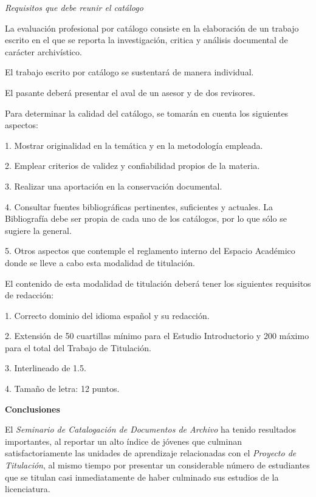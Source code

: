 \noindent \textsl{Requisitos que debe reunir el catálogo}

\noindent La evaluación profesional por catálogo consiste en la 
elaboración de un trabajo escrito en el que se reporta la 
investigación, critica y análisis documental de carácter archivístico.

El trabajo escrito por catálogo se sustentará de manera individual.

El pasante deberá presentar el aval de un asesor y de dos revisores.

Para determinar la calidad del catálogo, se tomarán en cuenta los 
siguientes aspectos:
\begin{Obs} 
\item[1.] Mostrar originalidad en la temática y en la metodología empleada.
\item[2.] Emplear criterios de validez y confiabilidad propios de la materia.
\item[3.]  Realizar una aportación en la conservación documental.
\item[4.]  Consultar fuentes bibliográficas pertinentes, suficientes y actuales.
La Bibliografía debe ser propia de cada uno de los catálogos, por lo que
sólo se sugiere la general.
\item[5.]  Otros aspectos que contemple el reglamento interno del Espacio
Académico donde se lleve a cabo esta modalidad de titulación.
\end{Obs}

El contenido de esta modalidad de titulación deberá tener los 
siguientes requisitos de redacción:
\begin{Obs}
\item[1.]  Correcto dominio del idioma español y su redacción.
\item[2.]  Extensión de 50 cuartillas mínimo para el Estudio Introductorio 
y 200 máximo para el total del Trabajo de Titulación.
\item[3.]  Interlineado de 1.5.
\item[4.]  Tamaño de letra: 12 puntos.
\end{Obs}

\smallskip
\noindent \textbf{Conclusiones}
\enlargethispage{\baselineskip}

\noindent El \textit{Seminario de Catalogación de Documentos de 
Archivo} ha tenido resultados importantes, al reportar un alto índice 
de jóvenes que culminan satisfactoriamente las unidades de aprendizaje 
relacionadas con el \textit{Proyecto de Titulación}, al mismo tiempo 
por presentar un considerable número de estudiantes que se titulan casi 
inmediatamente de haber culminado sus estudios de la licenciatura.

